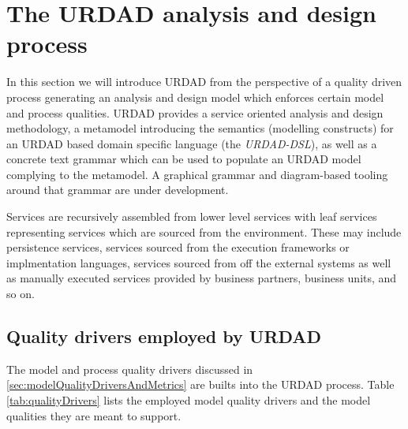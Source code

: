 \section{The URDAD analysis and design process}

In this section we will introduce URDAD from the perspective of a quality driven process generating an analysis and design model which enforces certain model and process qualities.  URDAD\cite{solms_generating_2009} provides a service oriented analysis and design methodology, a metamodel introducing the semantics (modelling constructs) for an URDAD based domain specific language (the \emph{URDAD-DSL}), as well as a concrete text grammar which can be used to populate an URDAD model complying to the metamodel. A graphical grammar and diagram-based tooling around that grammar are under development. 

Services are recursively assembled from lower level services with leaf services representing services which are sourced from the environment. These may include persistence services, services sourced from the execution frameworks or implmentation languages, services sourced from off the external systems as well as manually executed services provided by business partners, business units, and so on.


\subsection{Quality drivers employed by URDAD}

The model and process quality drivers discussed in \ref{sec:modelQualityDriversAndMetrics} are builts into the URDAD process. Table \ref{tab:qualityDrivers} lists the employed model quality drivers and the model qualities they are meant to support.

